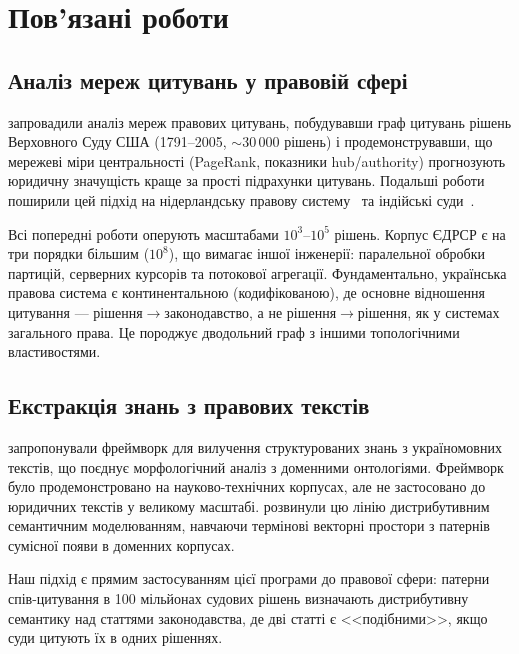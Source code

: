 \documentclass[11pt]{article}
\begin{document}
\section{Пов'язані роботи}
\label{sec:related}

\subsection{Аналіз мереж цитувань у правовій сфері}

\citet{fowler2007network} запровадили аналіз мереж правових цитувань, побудувавши граф цитувань рішень Верховного Суду США (1791--2005, ${\sim}30\,000$ рішень) і продемонструвавши, що мережеві міри центральності (PageRank, показники hub/authority) прогнозують юридичну значущість краще за прості підрахунки цитувань.
Подальші роботи поширили цей підхід на нідерландську правову систему~\citep{winkels2012determining,geist2009using} та індійські суди~\citep{kumar2022citationnet}.

Всі попередні роботи оперують масштабами $10^3$--$10^5$ рішень.
Корпус ЄДРСР є на три порядки більшим ($10^8$), що вимагає іншої інженерії: паралельної обробки партицій, серверних курсорів та потокової агрегації.
Фундаментально, українська правова система є континентальною (кодифікованою), де основне відношення цитування --- рішення$\to$законодавство, а не рішення$\to$рішення, як у системах загального права.
Це породжує дводольний граф з іншими топологічними властивостями.

\subsection{Екстракція знань з правових текстів}

\citet{palagin2012knowledge} запропонували фреймворк для вилучення структурованих знань з україномовних текстів, що поєднує морфологічний аналіз з доменними онтологіями.
Фреймворк було продемонстровано на науково-технічних корпусах, але не застосовано до юридичних текстів у великому масштабі.
\citet{palagin2020distributional} розвинули цю лінію дистрибутивним семантичним моделюванням, навчаючи термінові векторні простори з патернів сумісної появи в доменних корпусах.

Наш підхід є прямим застосуванням цієї програми до правової сфери: патерни спів-цитування в 100 мільйонах судових рішень визначають дистрибутивну семантику над статтями законодавства, де дві статті є <<подібними>>, якщо суди цитують їх в одних рішеннях.
\end{document}
